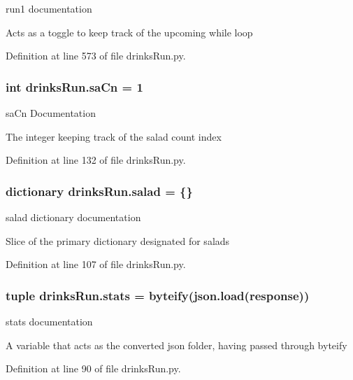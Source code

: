 run1 documentation 

Acts as a toggle to keep track of the upcoming while loop 

Definition at line 573 of file drinks\-Run.\-py.

\hypertarget{namespacedrinksRun_a60d9e7400407e80e21e2c6cea5cc188b}{
\subsubsection[{sa\-Cn}]{\setlength{\rightskip}{0pt plus 5cm}int drinks\-Run.\-sa\-Cn = 1}}\label{namespacedrinksRun_a60d9e7400407e80e21e2c6cea5cc188b}


sa\-Cn Documentation 

The integer keeping track of the salad count index 

Definition at line 132 of file drinks\-Run.\-py.

\hypertarget{namespacedrinksRun_a700ff198f4d372be39b8c8ce8bc10b9e}{
\subsubsection[{salad}]{\setlength{\rightskip}{0pt plus 5cm}dictionary drinks\-Run.\-salad = \{\}}}\label{namespacedrinksRun_a700ff198f4d372be39b8c8ce8bc10b9e}


salad dictionary documentation 

Slice of the primary dictionary designated for salads 

Definition at line 107 of file drinks\-Run.\-py.

\hypertarget{namespacedrinksRun_a6b296426121ab26d77f2ae73094ba1be}{
\subsubsection[{stats}]{\setlength{\rightskip}{0pt plus 5cm}tuple drinks\-Run.\-stats = {\bf byteify}(json.\-load({\bf response}))}}\label{namespacedrinksRun_a6b296426121ab26d77f2ae73094ba1be}


stats documentation 

A variable that acts as the converted json folder, having passed through byteify 

Definition at line 90 of file drinks\-Run.\-py.

